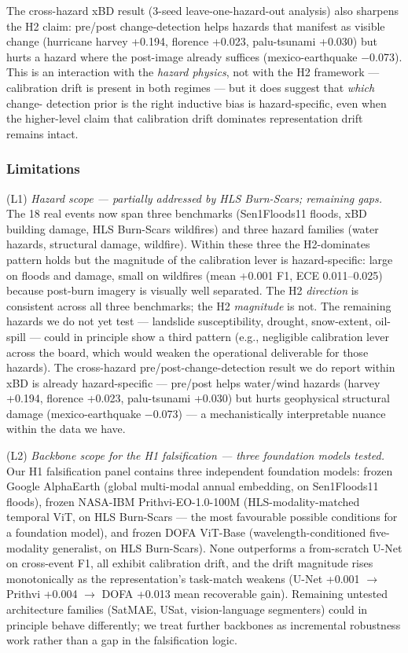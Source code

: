 The cross-hazard xBD result (3-seed leave-one-hazard-out analysis) also
sharpens the H2 claim: pre/post change-detection helps hazards that
manifest as visible change (hurricane harvey +0.194, florence +0.023,
palu-tsunami +0.030) but hurts a hazard where the post-image already
suffices (mexico-earthquake $-$0.073). This is an interaction with the
\emph{hazard physics}, not with the H2 framework --- calibration drift is
present in both regimes --- but it does suggest that \emph{which} change-
detection prior is the right inductive bias is hazard-specific, even
when the higher-level claim that calibration drift dominates
representation drift remains intact.

\subsubsection{Limitations}\label{limitations}

(L1) \emph{Hazard scope --- partially addressed by HLS Burn-Scars; remaining
gaps.} The 18 real events now span three benchmarks (Sen1Floods11 floods,
xBD building damage, HLS Burn-Scars wildfires) and three hazard families
(water hazards, structural damage, wildfire). Within these three the
H2-dominates pattern holds but the magnitude of the calibration lever is
hazard-specific: large on floods and damage, small on wildfires (mean
+0.001 F1, ECE 0.011--0.025) because post-burn imagery is visually well
separated. The H2 \emph{direction} is consistent across all three benchmarks;
the H2 \emph{magnitude} is not. The remaining hazards we do not yet test ---
landslide susceptibility, drought, snow-extent, oil-spill --- could in
principle show a third pattern (e.g., negligible calibration lever
across the board, which would weaken the operational deliverable for
those hazards). The cross-hazard pre/post-change-detection result we
do report within xBD is already hazard-specific --- pre/post helps
water/wind hazards (harvey +0.194, florence +0.023, palu-tsunami
+0.030) but hurts geophysical structural damage (mexico-earthquake
$-$0.073) --- a mechanistically interpretable nuance within the data we
have.

(L2) \emph{Backbone scope for the H1 falsification --- three foundation models
tested.} Our H1 falsification panel contains three independent
foundation models: frozen Google AlphaEarth (global multi-modal annual
embedding, on Sen1Floods11 floods), frozen NASA-IBM
Prithvi-EO-1.0-100M (HLS-modality-matched temporal ViT, on HLS
Burn-Scars --- the most favourable possible conditions for a foundation
model), and frozen DOFA ViT-Base (wavelength-conditioned five-modality
generalist, on HLS Burn-Scars). None outperforms a from-scratch U-Net
on cross-event F1, all exhibit calibration drift, and the drift
magnitude rises monotonically as the representation's task-match
weakens (U-Net +0.001 $\rightarrow$ Prithvi +0.004 $\rightarrow$ DOFA +0.013 mean recoverable
gain). Remaining untested architecture families (SatMAE, USat,
vision-language segmenters) could in principle behave differently; we
treat further backbones as incremental robustness work rather than a
gap in the falsification logic.

